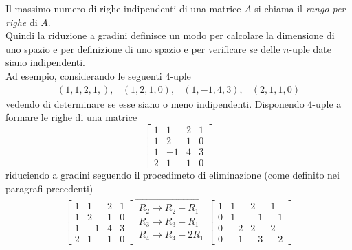 \begin{defi}
  \label{defi:gauss-jorda2}
  Il massimo numero di righe indipendenti di una matrice $A$ si
  chiama il \textit{rango per righe} di $A$.\\
  Quindi la riduzione a gradini definisce un modo per calcolare la
  dimensione di uno spazio e per definizione di uno spazio e per
  verificare se delle $n$-uple date siano indipendenti.\\
  Ad esempio, considerando le seguenti 4-uple
  \begin{equation}
    \label{eq:gauss-jorda2-1}
    \begin{matrix}
      (1,1,2,1,), & (1,2,1,0), & (1,-1,4,3), & (2,1,1,0)
    \end{matrix} 
  \end{equation}
  vedendo di determinare se esse siano o meno indipendenti. Disponendo
  4-uple a formare le righe di una matrice
  \begin{equation*}
    \begin{bmatrix}
      1 & 1 & 2 & 1\\
      1 & 2 & 1 & 0\\
      1 & -1 & 4 & 3\\
      2 & 1 & 1 & 0
    \end{bmatrix}
  \end{equation*}
  riduciendo a gradini seguendo il procedimeto di eliminazione (come
  definito nei paragrafi precedenti)
  \begin{equation}
    \label{eq:gauss-jorda2-2}
    \begin{matrix}
      \begin{bmatrix}
        1 & 1 & 2 & 1\\
        1 & 2 & 1 & 0\\
        1 & -1 & 4 & 3\\
        2 & 1 & 1 & 0
      \end{bmatrix}
      \overrightarrow{
      \begin{matrix}
        R_2\to R_2-R_1\\
        R_3\to R_3-R_1\\
        R_4\to R_4-2R_1
      \end{matrix}
      }
      \begin{bmatrix}
        1 & 1 & 2 & 1\\
        0 & 1 & -1 & -1\\
        0 & -2 & 2 & 2\\
        0 & -1 & -3 & -2
      \end{bmatrix}

\end{matrix}
\end{equation}
\end{defi}
